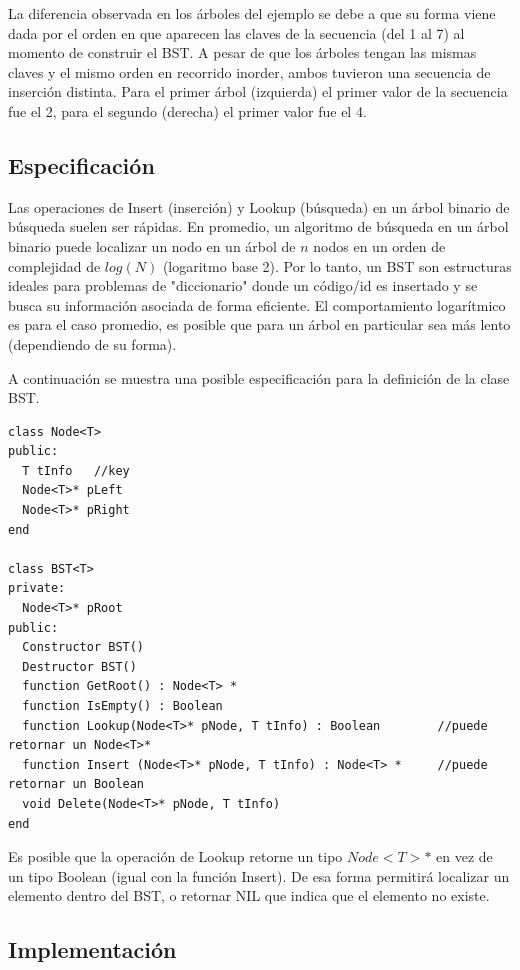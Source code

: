 La diferencia observada en los árboles del ejemplo se debe a que su forma viene dada por el orden en que aparecen las claves de la secuencia (del 1 al 7) al momento de construir el BST. A pesar de que los árboles tengan las mismas claves y el mismo orden en recorrido inorder, ambos tuvieron una secuencia de inserción distinta. Para el primer árbol (izquierda) el primer valor de la secuencia fue el 2, para el segundo (derecha) el primer valor fue el 4.


\subsection{Especificación}

Las operaciones de Insert (inserción) y Lookup (búsqueda) en un árbol binario de búsqueda suelen ser rápidas. En promedio, un algoritmo de búsqueda en un árbol binario puede localizar un nodo en un árbol de $n$ nodos en un orden de complejidad de $log(N)$ (logaritmo base 2). Por lo tanto, un BST son estructuras ideales para problemas de "diccionario" donde un código/id es insertado y se busca su información asociada de forma eficiente. El comportamiento logarítmico es para el caso promedio, es posible que para un árbol en particular sea más lento (dependiendo de su forma).

A continuación se muestra una posible especificación para la definición de la clase BST.

\begin{lstlisting}[upquote=true, language=pseudo]
class Node<T>
public:
  T tInfo	//key
  Node<T>* pLeft
  Node<T>* pRight
end

class BST<T>
private:
  Node<T>* pRoot
public:
  Constructor BST()
  Destructor BST()
  function GetRoot() : Node<T> *
  function IsEmpty() : Boolean
  function Lookup(Node<T>* pNode, T tInfo) : Boolean  		//puede retornar un Node<T>*
  function Insert (Node<T>* pNode, T tInfo) : Node<T> * 	//puede retornar un Boolean
  void Delete(Node<T>* pNode, T tInfo)
end
\end{lstlisting}

Es posible que la operación de Lookup retorne un tipo $Node<T>*$ en vez de un tipo Boolean (igual con la función Insert). De esa forma permitirá localizar un elemento dentro del BST, o retornar NIL que indica que el elemento no existe.

\subsection{Implementación}

